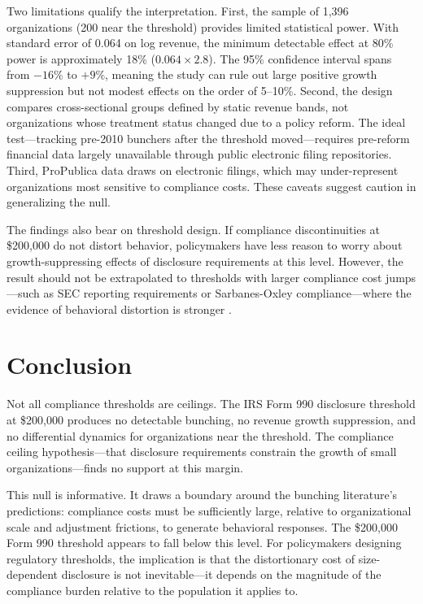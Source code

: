 \documentclass[12pt]{article}
\begin{document}
Two limitations qualify the interpretation. First, the sample of 1,396 organizations (200 near the threshold) provides limited statistical power. With standard error of 0.064 on log revenue, the minimum detectable effect at 80\% power is approximately 18\% ($0.064 \times 2.8$). The 95\% confidence interval spans from $-16\%$ to $+9\%$, meaning the study can rule out large positive growth suppression but not modest effects on the order of 5--10\%. Second, the design compares cross-sectional groups defined by static revenue bands, not organizations whose treatment status changed due to a policy reform. The ideal test---tracking pre-2010 bunchers after the threshold moved---requires pre-reform financial data largely unavailable through public electronic filing repositories. Third, ProPublica data draws on electronic filings, which may under-represent organizations most sensitive to compliance costs. These caveats suggest caution in generalizing the null.

The findings also bear on threshold design. If compliance discontinuities at \$200,000 do not distort behavior, policymakers have less reason to worry about growth-suppressing effects of disclosure requirements at this level. However, the result should not be extrapolated to thresholds with larger compliance cost jumps---such as SEC reporting requirements or Sarbanes-Oxley compliance---where the evidence of behavioral distortion is stronger \citep{marx2021compliance}.


\section{Conclusion}

Not all compliance thresholds are ceilings. The IRS Form 990 disclosure threshold at \$200,000 produces no detectable bunching, no revenue growth suppression, and no differential dynamics for organizations near the threshold. The compliance ceiling hypothesis---that disclosure requirements constrain the growth of small organizations---finds no support at this margin.

This null is informative. It draws a boundary around the bunching literature's predictions: compliance costs must be sufficiently large, relative to organizational scale and adjustment frictions, to generate behavioral responses. The \$200,000 Form 990 threshold appears to fall below this level. For policymakers designing regulatory thresholds, the implication is that the distortionary cost of size-dependent disclosure is not inevitable---it depends on the magnitude of the compliance burden relative to the population it applies to.
\end{document}
